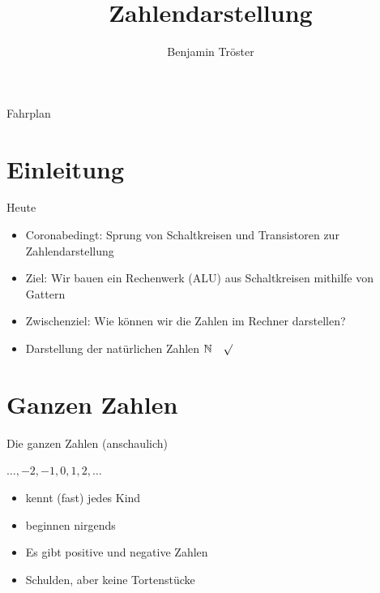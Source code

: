 \documentclass[12pt%
,aspectratio=169%
]{beamer}
\author{Benjamin Tröster}
\title[Zahlendarstellung]{Zahlendarstellung}
\institute[HTW Berlin]{Hochschule für Technik und Wirtschaft Berlin}
\begin{document}
\begin{frame}
\titlepage
\end{frame}

\begin{frame}{Fahrplan}
\tableofcontents[hideothersubsections]
\end{frame}

\section{Einleitung}
\begin{frame}{Heute}
\begin{itemize}
	\item Coronabedingt: Sprung von Schaltkreisen und Transistoren zur Zahlendarstellung
	\item Ziel: Wir bauen ein Rechenwerk (ALU) aus Schaltkreisen mithilfe von Gattern
	\item Zwischenziel: Wie können wir die Zahlen im Rechner darstellen?
	\item Darstellung der natürlichen Zahlen $\mathbb{N} \quad \surd$
\end{itemize}
\end{frame}



\section{Ganzen Zahlen}
\begin{frame}{Die ganzen Zahlen (anschaulich)}
\begin{center}
\Huge{$\ldots, -2, -1, 0,1,2,\ldots$}
\end{center}
\begin{itemize}
	\item kennt (fast) jedes Kind
	\item beginnen nirgends
	\item Es gibt positive und negative Zahlen
	\item Schulden, aber keine Tortenstücke
\end{itemize}
\end{frame}
\end{document}
